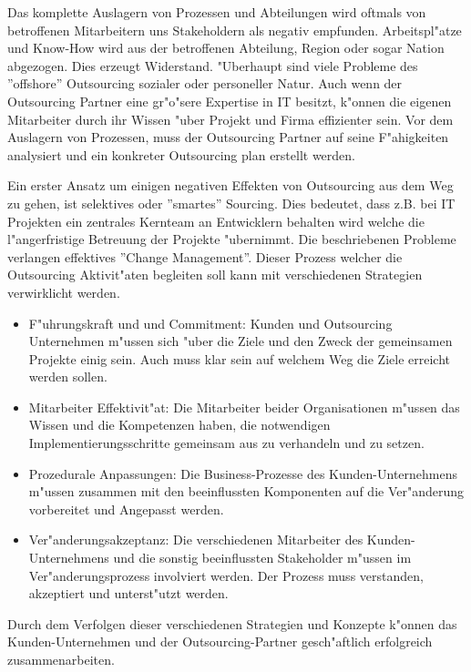 Das komplette Auslagern von Prozessen und Abteilungen wird oftmals von betroffenen Mitarbeitern uns Stakeholdern als negativ empfunden. Arbeitspl"atze und Know-How wird aus der betroffenen Abteilung, Region oder sogar Nation abgezogen. Dies erzeugt Widerstand. "Uberhaupt sind viele Probleme des ''offshore'' Outsourcing sozialer oder personeller Natur. \cite{Mikita2012} Auch wenn der Outsourcing Partner eine gr"o"sere Expertise in IT besitzt, k"onnen die eigenen Mitarbeiter durch ihr Wissen "uber Projekt und Firma effizienter sein. Vor dem Auslagern von Prozessen, muss der Outsourcing Partner auf seine F"ahigkeiten analysiert und ein konkreter Outsourcing plan erstellt werden.

Ein erster Ansatz um einigen negativen Effekten von Outsourcing aus dem Weg zu gehen, ist selektives oder ''smartes'' Sourcing. \cite{Mikita2012} Dies bedeutet, dass z.B. bei IT Projekten ein zentrales Kernteam an Entwicklern behalten wird welche die l"angerfristige Betreuung der Projekte "ubernimmt. Die beschriebenen Probleme verlangen effektives ''Change Management''. Dieser Prozess welcher die Outsourcing Aktivit"aten begleiten soll kann mit verschiedenen Strategien verwirklicht werden.\cite{Mikita2012} 

\begin{itemize}

	\item F"uhrungskraft und und Commitment: Kunden und Outsourcing Unternehmen m"ussen sich "uber die Ziele und den Zweck der gemeinsamen Projekte einig sein. Auch muss klar sein auf welchem Weg die Ziele erreicht werden sollen.
	
	\item Mitarbeiter Effektivit"at: Die Mitarbeiter beider Organisationen m"ussen das Wissen und die Kompetenzen haben, die notwendigen Implementierungsschritte gemeinsam aus zu verhandeln und zu setzen.

 	\item Prozedurale Anpassungen: Die Business-Prozesse des Kunden-Unternehmens m"ussen zusammen mit den beeinflussten Komponenten auf die Ver"anderung vorbereitet und Angepasst werden.

	\item Ver"anderungsakzeptanz: Die verschiedenen Mitarbeiter des Kunden-Unternehmens und die sonstig beeinflussten Stakeholder m"ussen im Ver"anderungsprozess involviert werden. Der Prozess muss verstanden, akzeptiert und unterst"utzt werden.

\end{itemize}

Durch dem Verfolgen dieser verschiedenen Strategien und Konzepte k"onnen das Kunden-Unternehmen und der Outsourcing-Partner gesch"aftlich erfolgreich zusammenarbeiten. 